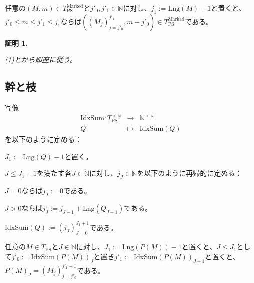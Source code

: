 \documentclass[dvipdfmx,uplatex]{jsarticle}
\theoremstyle{customnonumberbreakfortheorem}
\theoremstyle{customnonumberbreakforproof}
\newtheorem{hideableproof}{証明}
\begin{document}
\begin{proposition}[基点の切片への遺伝性]\label{基点の切片への遺伝性}
	任意の\((M,m) \in T_{\textrm{PS}}^{\textrm{Marked}}\)と\(j'_0,j'_1 \in \mathbb{N}\)に対し、\(j_1 := \textrm{Lng}(M) - 1\)と置くと、\(j'_0 \leq m \leq j'_1 \leq j_1\)ならば\(((M_j)_{j=j'_0}^{j'_1},m-j'_0) \in T_{\textrm{PS}}^{\textrm{Marked}}\)である。
\end{proposition}

\begin{hideableproof}
	\begin{indented}
		\item {} (1)とから即座に従う。
	\end{indented}
\end{hideableproof}


\subsection{幹と枝}

写像
\begin{eqnarray*}
\textrm{IdxSum} \colon T_{\textrm{PS}}^{< \omega} & \to & \mathbb{N}^{< \omega} \\
Q & \mapsto & \textrm{IdxSum}(Q)
\end{eqnarray*}
を以下のように定める：
\begin{nenumerate}
	\item \(J_1 := \textrm{Lng}(Q)-1\)と置く。
	\item \(J \leq J_1+1\)を満たす各\(J \in \mathbb{N}\)に対し、\(j_J \in \mathbb{N}\)を以下のように再帰的に定める：
	\begin{nenumerate}
		\item \(J = 0\)ならば\(j_J := 0\)である。
		\item \(J > 0\)ならば\(j_J := j_{J-1} + \textrm{Lng}(Q_{J-1})\)である。
	\end{nenumerate}
	\item \(\textrm{IdxSum}(Q) := (j_J)_{J=0}^{J_1+1}\)である。
\end{nenumerate}

\begin{proposition}\label{PとIdxSumの関係}
	任意の\(M \in T_{\textrm{PS}}\)と\(J \in \mathbb{N}\)に対し、\(J_1 := \textrm{Lng}(P(M))-1\)と置くと、\(J \leq J_1\)として\(j'_0 := \textrm{IdxSum}(P(M))_J\)と置き\(j'_1 := \textrm{IdxSum}(P(M))_{J+1}\)と置くと、\(P(M)_J = (M_j)_{j=j'_0}^{j'_1-1}\)である。
\end{proposition}
\end{document}
